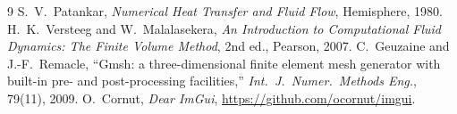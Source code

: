 \documentclass[11pt]{article}
\begin{document}
\begin{thebibliography}{9}
 S.~V.~Patankar, \emph{Numerical Heat Transfer and Fluid Flow}, Hemisphere, 1980.
 H.~K.~Versteeg and W.~Malalasekera, \emph{An Introduction to Computational Fluid Dynamics: The Finite Volume Method}, 2nd ed., Pearson, 2007.
 C.~Geuzaine and J.-F.~Remacle, ``Gmsh: a three-dimensional finite element mesh generator with built-in pre- and post-processing facilities,'' \emph{Int.\ J.\ Numer.\ Methods Eng.}, 79(11), 2009.
 O.~Cornut, \emph{Dear ImGui}, \url{https://github.com/ocornut/imgui}.
\end{thebibliography}
\end{document}
